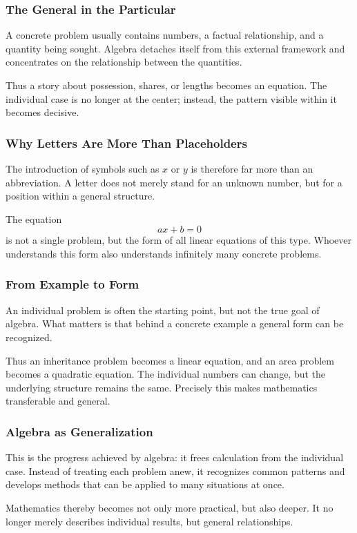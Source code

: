 \subsubsection*{The General in the Particular}
A concrete problem usually contains numbers,
a factual relationship, and a quantity being sought.
Algebra detaches itself from this external framework
and concentrates on the relationship between the quantities.

Thus a story about possession, shares, or lengths
becomes an equation.
The individual case is no longer at the center;
instead, the pattern visible within it becomes decisive.

\subsubsection*{Why Letters Are More Than Placeholders}
The introduction of symbols such as \(x\) or \(y\)
is therefore far more than an abbreviation.
A letter does not merely stand for an unknown number,
but for a position within a general structure.

The equation
\[
ax+b=0
\]
is not a single problem,
but the form of all linear equations of this type.
Whoever understands this form
also understands infinitely many concrete problems.

\subsubsection*{From Example to Form}
An individual problem is often the starting point,
but not the true goal of algebra.
What matters is
that behind a concrete example
a general form can be recognized.

Thus an inheritance problem becomes a linear equation,
and an area problem becomes a quadratic equation.
The individual numbers can change,
but the underlying structure remains the same.
Precisely this makes mathematics transferable and general.

\subsubsection*{Algebra as Generalization}
This is the progress achieved by algebra:
it frees calculation from the individual case.
Instead of treating each problem anew,
it recognizes common patterns
and develops methods
that can be applied to many situations at once.

Mathematics thereby becomes not only more practical,
but also deeper.
It no longer merely describes individual results,
but general relationships.

